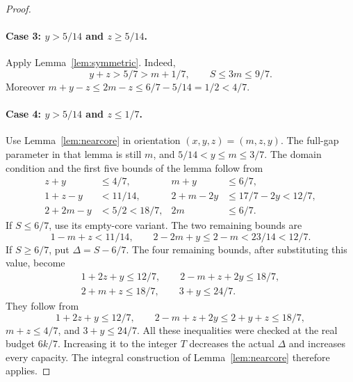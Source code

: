 \documentclass[11pt]{article}
\numberwithin{equation}{section}
\theoremstyle{definition}
\theoremstyle{remark}
\begin{document}
\begin{proof}
\paragraph{Case 3: $y>5/14$ and $z\ge5/14$.}
Apply Lemma~\ref{lem:symmetric}. Indeed,
\[
 y+z>5/7>m+1/7,\qquad S\le3m\le9/7.
\]
Moreover $m+y-z\le2m-z\le6/7-5/14=1/2<4/7$.

\paragraph{Case 4: $y>5/14$ and $z\le1/7$.}
Use Lemma~\ref{lem:nearcore} in orientation $(x,y,z)=(m,z,y)$.
The full-gap parameter in that lemma is still $m$, and
$5/14<y\le m\le3/7$.
The domain condition and the first five bounds of the lemma follow from
\begin{align*}
 z+y&\le4/7,&m+y&\le6/7,\\
 1+z-y&<11/14,&2+m-2y&\le17/7-2y<12/7,\\
 2+2m-y&<5/2<18/7,&2m&\le6/7.
\end{align*}
If $S\le6/7$, use its empty-core variant. The two remaining bounds are
\[
 1-m+z<11/14,\qquad 2-2m+y\le2-m<23/14<12/7.
\]
If $S\ge6/7$, put $\Delta=S-6/7$. The four remaining bounds, after
substituting this value, become
\begin{gather*}
 1+2z+y\le12/7,\qquad 2-m+z+2y\le18/7,\\
 2+m+z\le18/7,\qquad 3+y\le24/7.
\end{gather*}
They follow from
\[
 1+2z+y\le12/7,\qquad 2-m+z+2y\le2+y+z\le18/7,
\]
$m+z\le4/7$, and $3+y\le24/7$.
All these inequalities were checked at the real budget $6k/7$.
Increasing it to the integer $T$ decreases the actual $\Delta$ and
increases every capacity. The integral construction of
Lemma~\ref{lem:nearcore} therefore applies.
\end{proof}
\end{document}
